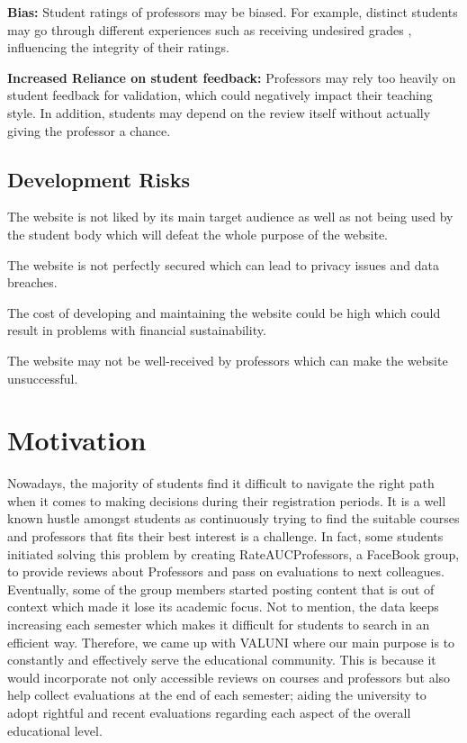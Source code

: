 \documentclass{article}
\begin{document}
\textbf{Bias:} Student ratings of professors may be biased. For example, distinct students may go through different experiences such as receiving undesired grades , influencing the integrity of their ratings.

\textbf{Increased Reliance on student feedback:} Professors may rely too heavily on student feedback for validation, which could negatively impact their teaching style. In addition, students may depend on the review itself without actually giving the professor a chance.

\subsection{Development Risks} 

The website is not liked by its main target audience as well as not being used by the student body which will defeat the whole purpose of the website.

The website is not perfectly secured which can lead to privacy issues and data breaches.

The cost of developing and maintaining the website could be high which could result in problems with financial sustainability.

The website may not be well-received by professors which can make the website unsuccessful.



\section{Motivation} 

\quad Nowadays, the majority of students find it difficult to navigate the right path when it comes to making decisions during their registration periods. It is a well known hustle amongst students as continuously trying  to find the suitable courses and professors that fits their best interest is a challenge.  In fact, some students initiated solving this problem by creating  RateAUCProfessors, a FaceBook group, to provide reviews about Professors and pass on evaluations to next colleagues. Eventually, some of the group members started posting content that is out of context which made it lose its academic focus. Not to mention, the data keeps increasing each semester which makes it difficult for students to search in an efficient way. Therefore, we came up with VALUNI  where our main purpose is to constantly and effectively serve the educational community. This is because it would incorporate not only accessible reviews on courses and professors but also help collect evaluations at the end of each semester; aiding the university to adopt rightful and recent evaluations regarding each aspect of the overall educational level. 
\end{document}
